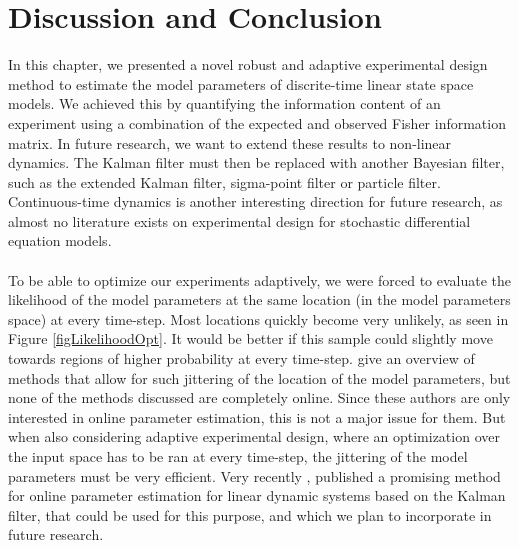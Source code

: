 \section{Discussion and Conclusion}
In this chapter, we presented a novel robust and adaptive experimental design method to estimate the model parameters of discrite-time linear state space models. We achieved this by quantifying the information content of an experiment using a combination of the expected and observed Fisher information matrix. In future research, we want to extend these results to non-linear dynamics. The Kalman filter must then be replaced with another Bayesian filter, such as the extended Kalman filter, sigma-point filter or particle filter. Continuous-time dynamics is another interesting direction for future research, as almost no literature exists on experimental design for stochastic differential equation models.
\\
\\
To be able to optimize our experiments adaptively, we were forced to evaluate the likelihood of the model parameters at the same location (in the model parameters space) at every time-step. Most locations quickly become very unlikely, as seen in Figure \ref{figLikelihoodOpt}. It would be better if this sample could slightly move towards regions of higher probability at every time-step. \textcite{kantas} give an overview of methods that allow for such jittering of the location of the model parameters, but none of the methods discussed are completely online. Since these authors are only interested in online parameter estimation, this is not a major issue for them. But when also considering adaptive experimental design, where an optimization over the input space has to be ran at every time-step, the jittering of the model parameters must be very efficient. Very recently \textcite{he}, published a promising method for online parameter estimation for linear dynamic systems based on the Kalman filter, that could be used for this purpose, and which we plan to incorporate in future research.